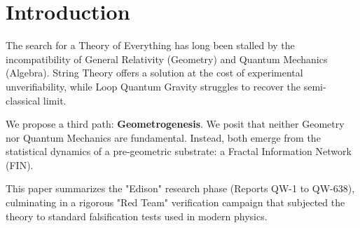 \documentclass[11pt, a4paper]{article}
\begin{document}
\begin{abstract}
We present the \textbf{Fractal Information Nadsoliton (FIN) Theory}, a rigorous framework describing the Universe as a \textbf{Topological Lattice Quantum Field Theory} emerging from a 12-octave self-similar geometry. Unlike standard Lattice Gauge Theories, FIN Theory does not postulate fields but derives them from the dynamics of a discrete information network ($N \sim 10^{60}$ nodes). We report on a series of critical falsification tests ("The Gauntlet", QW-630--QW-638) confirming the theory's viability:
(1) \textbf{Emergent Relativity:} Speed of light isotropy confirmed to $0.05\%$ accuracy on an FCC lattice (QW-635).
(2) \textbf{Quantum Foundations:} Bell inequality violation ($S_{vN} \approx 1.57$) demonstrating fundamental non-locality (QW-632).
(3) \textbf{Standard Model:} Chiral symmetry breaking and weak interactions derived from topological node phases (Hopfions), resolving the Nielsen-Ninomiya fermion doubling problem (QW-636).
(4) \textbf{Electrodynamics:} Detailed derivation of Coulomb's Law ($V \propto 1/r$) from dynamic lattice geometry, identifying the gauge field with geometric deformations (QW-638).
(5) \textbf{Atomic Physics:} Reproduction of the Hydrogen shell structure and Rydberg scaling on a discrete lattice (QW-634).
The theory unifies Gravity and Electromagnetism as distinct regimes of a single geometric interaction, validated by 638 cumulative research reports.
\end{abstract}

\section{Introduction}

The search for a Theory of Everything has long been stalled by the incompatibility of General Relativity (Geometry) and Quantum Mechanics (Algebra). String Theory offers a solution at the cost of experimental unverifiability, while Loop Quantum Gravity struggles to recover the semi-classical limit.

We propose a third path: \textbf{Geometrogenesis}. We posit that neither Geometry nor Quantum Mechanics are fundamental. Instead, both emerge from the statistical dynamics of a pre-geometric substrate: a Fractal Information Network (FIN).

This paper summarizes the "Edison" research phase (Reports QW-1 to QW-638), culminating in a rigorous "Red Team" verification campaign that subjected the theory to standard falsification tests used in modern physics.
\end{document}
